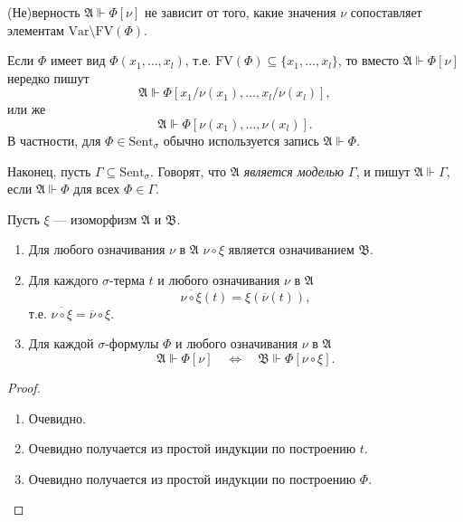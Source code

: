 \documentclass[12pt,a4paper]{article}
\newcommand{\Var}{\ensuremath{\mathrm{Var}}\xspace}
\newcommand{\FV}{\ensuremath{\mathrm{FV}}\xspace}
\newcommand{\Sent}{\ensuremath{\mathrm{Sent}}\xspace}
\begin{document}
    \begin{remark}
        (Не)верность $\mathfrak{A} \Vdash \Phi[\nu]$ не зависит от того, какие значения $\nu$ сопоставляет элементам $\Var \setminus \FV(\Phi)$.
    \end{remark}

    \begin{definition}
        Если $\Phi$ имеет вид $\Phi(x_1, \dots, x_l)$, т.е. $\FV(\Phi) \subseteq \{x_1, \dots, x_l\}$, то вместо $\mathfrak{A} \Vdash \Phi[\nu]$ нередко пишут
        \[\mathfrak{A} \Vdash \Phi[x_1/\nu(x_1), \dots, x_l/\nu(x_l)],\]
        или же
        \[\mathfrak{A} \Vdash \Phi[\nu(x_1), \dots, \nu(x_l)].\]
        В частности, для $\Phi \in \Sent_\sigma$ обычно используется запись $\mathfrak{A} \Vdash \Phi$.

        Наконец, пусть $\Gamma \subseteq \Sent_\sigma$. Говорят, что \emph{$\mathfrak{A}$ является моделью $\Gamma$}, и пишут $\mathfrak{A} \Vdash \Gamma$, если $\mathfrak{A} \Vdash \Phi$ для всех $\Phi \in \Gamma$.
    \end{definition}

    \begin{theorem}\label{attribution-through-isomorphism-theorem}
        Пусть $\xi$ --- изоморфизм $\mathfrak{A}$ и $\mathfrak{B}$.
        \begin{enumerate}
            \item Для любого означивания $\nu$ в $\mathfrak{A}$ $\nu \circ \xi$ является означиванием $\mathfrak{B}$.
            \item Для каждого $\sigma$-терма $t$ и любого означивания $\nu$ в $\mathfrak{A}$
                \[\overline{\nu \circ \xi}(t) = \xi(\overline{\nu}(t)),\]
                т.е. $\overline{\nu \circ \xi} = \overline{\nu} \circ \xi$.
            \item Для каждой $\sigma$-формулы $\Phi$ и любого означивания $\nu$ в $\mathfrak{A}$
                \[
                    \mathfrak{A} \Vdash \Phi[\nu]
                    \quad \Longleftrightarrow \quad
                    \mathfrak{B} \Vdash \Phi[\nu \circ \xi].
                \]
        \end{enumerate}
    \end{theorem}

    \begin{proof}
        \begin{enumerate}
            \item Очевидно.
            \item Очевидно получается из простой индукции по построению $t$.
            \item Очевидно получается из простой индукции по построению $\Phi$.
        \end{enumerate}
    \end{proof}
\end{document}
